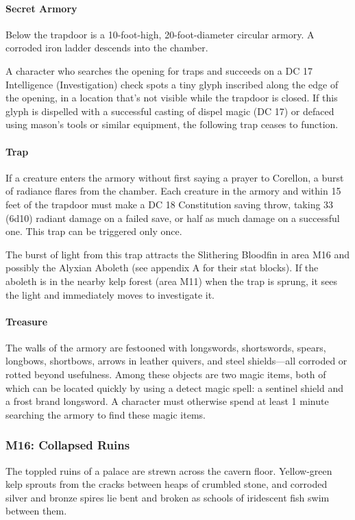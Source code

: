 \documentclass[10pt,a4paper,twoside,bg=print,twocolumn,openany,nodeprecatedcode]{dndbook}
\begin{document}
\paragraph{Secret Armory}
Below the trapdoor is a 10-foot-high, 20-foot-diameter circular armory. A corroded iron ladder descends into the chamber.

A character who searches the opening for traps and succeeds on a DC 17 Intelligence (Investigation) check spots a tiny glyph inscribed along the edge of the opening, in a location that's not visible while the trapdoor is closed. If this glyph is dispelled with a successful casting of dispel magic (DC 17) or defaced using mason's tools or similar equipment, the following trap ceases to function.

\paragraph{Trap}
If a creature enters the armory without first saying a prayer to Corellon, a burst of radiance flares from the chamber. Each creature in the armory and within 15 feet of the trapdoor must make a DC 18 Constitution saving throw, taking 33 (6d10) radiant damage on a failed save, or half as much damage on a successful one. This trap can be triggered only once.

The burst of light from this trap attracts the Slithering Bloodfin in area M16 and possibly the Alyxian Aboleth (see appendix A for their stat blocks). If the aboleth is in the nearby kelp forest (area M11) when the trap is sprung, it sees the light and immediately moves to investigate it.

\paragraph{Treasure}
The walls of the armory are festooned with longswords, shortswords, spears, longbows, shortbows, arrows in leather quivers, and steel shields—all corroded or rotted beyond usefulness. Among these objects are two magic items, both of which can be located quickly by using a detect magic spell: a sentinel shield and a frost brand longsword. A character must otherwise spend at least 1 minute searching the armory to find these magic items.

\subsubsection{M16: Collapsed Ruins}
\begin{DndReadAloud}{}
The toppled ruins of a palace are strewn across the cavern floor. Yellow-green kelp sprouts from the cracks between heaps of crumbled stone, and corroded silver and bronze spires lie bent and broken as schools of iridescent fish swim between them.

\end{DndReadAloud}
\end{document}
